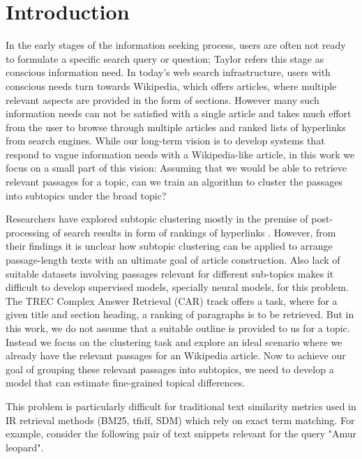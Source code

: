 \documentclass[sigconf,authordraft]{acmart}
\begin{document}
\section{Introduction}
In the early stages of the information seeking process, users are often not ready to formulate a specific search query or question; Taylor\cite{taylor2015question} refers this stage as conscious information need. In today's web search infrastructure, users with conscious needs turn towards Wikipedia, which offers articles, where multiple relevant aspects are provided in the form of sections. However many such information needs can not be satisfied with a single article and takes much effort from the user to browse through multiple articles and ranked lists of hyperlinks from search engines. While our long-term vision is to develop systems that respond to vague information needs with a Wikipedia-like article, in this work we focus on a small part of this vision: Assuming that we would be able to retrieve relevant passages for a topic, can we train an algorithm to cluster the passages into subtopics under the broad topic? \par
Researchers have explored subtopic clustering mostly in the premise of post-processing of search results in form of rankings of hyperlinks \cite{bernardini2009full, carpineto2012evaluating}. However, from their findings it is unclear how subtopic clustering can be applied to arrange passage-length texts with an ultimate goal of article construction. Also lack of suitable datasets involving passages relevant for different sub-topics makes it difficult to develop supervised models, specially neural models, for this problem. The TREC Complex Answer Retrieval (CAR)\cite{dietz2017trec} track offers a task, where for a given title and section heading, a ranking of paragraphs is to be retrieved. But in this work, we do not assume that a suitable outline is provided to us for a topic. Instead we focus on the clustering task and explore an ideal scenario where we already have the relevant passages for an Wikipedia article. Now to achieve our goal of grouping these relevant passages into subtopics, we need to develop a model that can estimate fine-grained topical differences.

This problem is particularly difficult for traditional text similarity metrics used in IR retrieval methods (BM25, tfidf, SDM) which rely on exact term matching. For example, consider the following pair of text snippets relevant for the query "Amur leopard".

\noindent{}
\noindent{}
\end{document}
